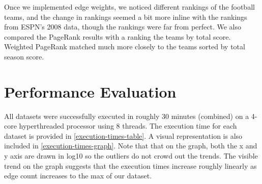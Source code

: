 \documentclass{report}
\newcommand{\pagerank}{PageRank }
\begin{document}
Once we implemented edge weights, we noticed different rankings of the football
teams, and the change in rankings seemed a bit more inline with the rankings
from ESPN's 2008 data, though the rankings were far from perfect. We also
compared the \pagerank results with a ranking the teams by total score. Weighted
\pagerank matched much more closely to the teams sorted by total season score.

\section{Performance Evaluation}
All datasets were successfully executed in roughly 30 minutes (combined) on a 4-core hyperthreaded processor using 8 threads. The execution time for each dataset is provided in \cref{execution-times-table}. A visual representation is also included in \cref{execution-times-graph}. Note that that on the graph, both the x and y axis are drawn in log10 so the outliers do not crowd out the trends. The visible trend on the graph suggests that the execution times increase roughly linearly as edge count increases to the max of our dataset.  
\end{document}
